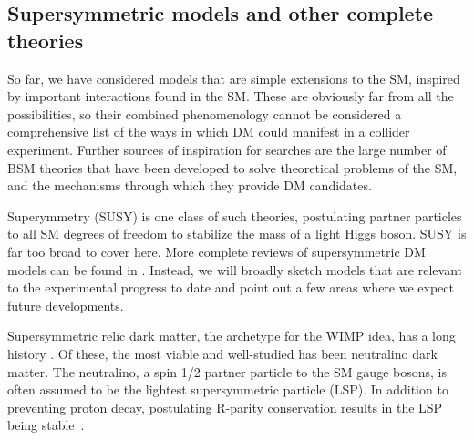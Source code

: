 \subsection{Supersymmetric models and other complete theories}
\label{sec:SUSYModels}

So far, we have considered models that are simple extensions to the SM, inspired by important interactions found in the SM. These are obviously far from all the possibilities, so their combined phenomenology cannot be considered a comprehensive list of the ways in which DM could manifest in a collider experiment. Further sources of inspiration for searches are the large number of BSM theories that have been developed to solve theoretical problems of the SM, and the mechanisms through which they provide DM candidates. 

Superymmetry (SUSY) is one class of such theories, postulating partner particles to all SM degrees of freedom to stabilize
the mass of a light Higgs boson.  SUSY is far too broad to cover here. More complete reviews of supersymmetric DM models can
be found in \cite{Feng:2010gw,Ellis:2010kf}. Instead, we will broadly sketch models that are relevant to
the experimental progress to date and point out a few areas where we expect future developments. 

Supersymmetric relic dark matter, the archetype for the WIMP idea, has a long
history \cite{doi:10.1016/0550-3213(84)90461-9}. Of these, the most viable and well-studied has been neutralino dark matter. 
The neutralino, a spin 1/2 partner particle to the SM gauge bosons, is often assumed to be the lightest supersymmetric particle (LSP). 
In addition to preventing proton decay, postulating R-parity conservation results in the LSP being stable~\cite{Farrar:1978xj}. 

